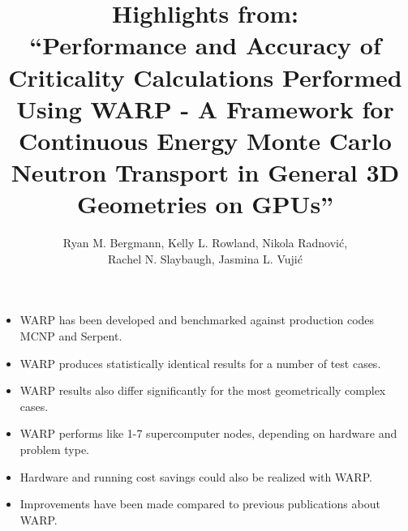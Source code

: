 \documentclass{article}
\begin{document}

\title{Highlights from:\\ ``Performance and Accuracy of Criticality Calculations Performed Using WARP - A Framework for Continuous Energy Monte Carlo Neutron Transport in General 3D Geometries on GPUs''}
\author{Ryan M. Bergmann, Kelly L. Rowland, Nikola Radnovi\'c, \\ Rachel N. Slaybaugh, Jasmina L. Vuji\'c}
\maketitle

\begin{itemize}
\item WARP has been developed and benchmarked against production codes MCNP and Serpent.
\item WARP produces statistically identical results for a number of test cases.
\item WARP results also differ significantly for the most geometrically complex cases.
\item WARP performs like 1-7 supercomputer nodes, depending on hardware and problem type.
\item Hardware and running cost savings could also be realized with WARP.
\item Improvements have been made compared to previous publications about WARP.
\end{itemize}
\end{document}
